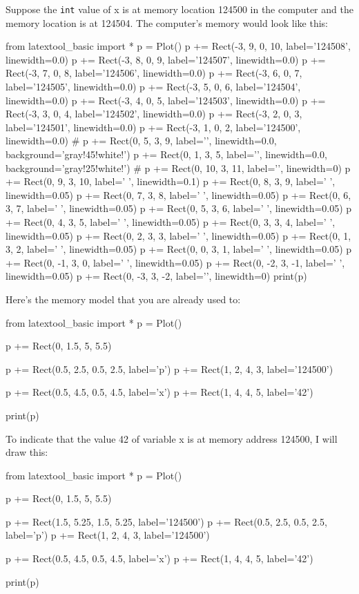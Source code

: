Suppose the \texttt{int} value of x is at memory location 124500 in the computer and the memory location is at 124504. The computer's memory would look like this:
\begin{python}
from latextool_basic import *
p = Plot()
p += Rect(-3, 9, 0, 10, label='124508', linewidth=0.0)
p += Rect(-3, 8, 0, 9, label='124507', linewidth=0.0)
p += Rect(-3, 7, 0, 8, label='124506', linewidth=0.0)
p += Rect(-3, 6, 0, 7, label='124505', linewidth=0.0)
p += Rect(-3, 5, 0, 6, label='124504', linewidth=0.0)
p += Rect(-3, 4, 0, 5, label='124503', linewidth=0.0)
p += Rect(-3, 3, 0, 4, label='124502', linewidth=0.0)
p += Rect(-3, 2, 0, 3, label='124501', linewidth=0.0)
p += Rect(-3, 1, 0, 2, label='124500', linewidth=0.0)
#
p += Rect(0, 5, 3, 9, label='', linewidth=0.0, background='gray!45!white!')
p += Rect(0, 1, 3, 5, label='', linewidth=0.0, background='gray!25!white!')
#
p += Rect(0, 10, 3, 11, label='', linewidth=0)
p += Rect(0, 9, 3, 10, label=' ', linewidth=0.1)
p += Rect(0, 8, 3, 9, label=' ', linewidth=0.05)
p += Rect(0, 7, 3, 8, label=' ', linewidth=0.05)
p += Rect(0, 6, 3, 7, label=' ', linewidth=0.05)
p += Rect(0, 5, 3, 6, label=' ', linewidth=0.05)
p += Rect(0, 4, 3, 5, label=' ', linewidth=0.05)
p += Rect(0, 3, 3, 4, label=' ', linewidth=0.05)
p += Rect(0, 2, 3, 3, label=' ', linewidth=0.05)
p += Rect(0, 1, 3, 2, label=' ', linewidth=0.05)
p += Rect(0, 0, 3, 1, label=' ', linewidth=0.05)
p += Rect(0, -1, 3, 0, label=' ', linewidth=0.05)
p += Rect(0, -2, 3, -1, label=' ', linewidth=0.05)
p += Rect(0, -3, 3, -2, label='', linewidth=0)
print(p)
\end{python}

Here's the memory model that you are already used to:

\begin{python}
from latextool_basic import *
p = Plot()

p += Rect(0, 1.5, 5, 5.5)

p += Rect(0.5, 2.5, 0.5, 2.5, label='p')
p += Rect(1, 2, 4, 3, label='124500')

p += Rect(0.5, 4.5, 0.5, 4.5, label='x')
p += Rect(1, 4, 4, 5, label='42')

print(p)
\end{python}

To indicate that the value 42 of variable x is at memory address 124500,
I will draw this:

\begin{python}
from latextool_basic import *
p = Plot()

p += Rect(0, 1.5, 5, 5.5)

p += Rect(1.5, 5.25, 1.5, 5.25, label='124500')
p += Rect(0.5, 2.5, 0.5, 2.5, label='p')
p += Rect(1, 2, 4, 3, label='124500')

p += Rect(0.5, 4.5, 0.5, 4.5, label='x')
p += Rect(1, 4, 4, 5, label='42')

print(p)
\end{python}

